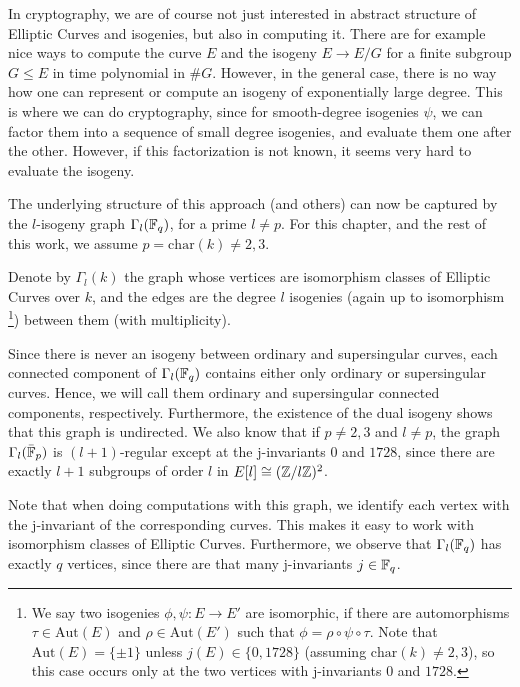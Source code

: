 
In cryptography, we are of course not just interested in abstract structure of Elliptic Curves and isogenies, but also in computing it.
There are for example nice ways to compute the curve $E$ and the isogeny $E \to E/G$ for a finite subgroup $G \leq E$ in time polynomial in $\#G$.
However, in the general case, there is no way how one can represent or compute an isogeny of exponentially large degree.
This is where we can do cryptography, since for smooth-degree isogenies $\psi$, we can factor them into a sequence of small degree isogenies, and evaluate them one after the other.
However, if this factorization is not known, it seems very hard to evaluate the isogeny.

The underlying structure of this approach (and others) can now be captured by the $l$-isogeny graph $\Gamma_l(\mathbb{F}_q)$, for a prime $l \neq p$.
For this chapter, and the rest of this work, we assume $p = \mathrm{char}(k) \neq 2, 3$.
\begin{definition}
    Denote by $\Gamma_l(k)$ the graph whose vertices are isomorphism classes of Elliptic Curves over $k$, and the edges are the degree $l$ isogenies (again up to isomorphism
    \footnote{We say two isogenies $\phi, \psi: E \to E'$ are isomorphic, if there are automorphisms $\tau \in \mathrm{Aut}(E)$ and $\rho \in \mathrm{Aut}(E')$ such that $\phi = \rho \circ \psi \circ \tau$.
    Note that $\mathrm{Aut}(E) = \{ \pm 1 \}$ unless $j(E) \in \{ 0, 1728 \}$ (assuming $\mathrm{char}(k) \neq 2, 3$), so this case occurs only at the two vertices with j-invariants $0$ and $1728$.}) 
    between them (with multiplicity).
\end{definition}
Since there is never an isogeny between ordinary and supersingular curves, each connected component of $\Gamma_l(\mathbb{F}_q)$ contains either only ordinary or supersingular curves.
Hence, we will call them ordinary and supersingular connected components, respectively.
Furthermore, the existence of the dual isogeny shows that this graph is undirected.
We also know that if $p \neq 2, 3$ and $l \neq p$, the graph $\Gamma_l(\bar{\mathbb{F}}_p)$ is $(l + 1)$-regular except at the j-invariants $0$ and $1728$, since there are exactly $l + 1$ subgroups of order $l$ in $E[l] \cong (\mathbb{Z}/l\mathbb{Z})^2$.

Note that when doing computations with this graph, we identify each vertex with the j-invariant of the corresponding curves.
This makes it easy to work with isomorphism classes of Elliptic Curves.
Furthermore, we observe that $\Gamma_l(\mathbb{F}_q)$ has exactly $q$ vertices, since there are that many j-invariants $j \in \mathbb{F}_q$.


